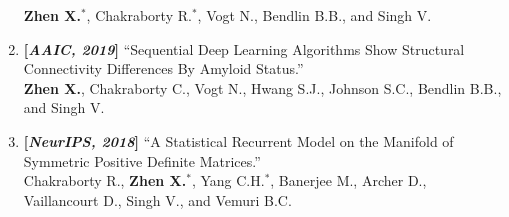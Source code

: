 \documentclass[margin]{res}
\begin{document}
\begin{resume}
\begin{enumerate}[noitemsep,wide=0pt,leftmargin=\dimexpr\labelwidth + 2\labelsep\relax]
                             \textbf{Zhen X.}$^*$, Chakraborty R.$^*$, Vogt N., Bendlin B.B., and Singh V. 
                \item \textbf{[\emph{AAIC, 2019}]} ``Sequential Deep Learning Algorithms Show Structural Connectivity Differences By Amyloid Status.''\\
                             \textbf{Zhen X.}, Chakraborty C., Vogt N., Hwang S.J., Johnson S.C., Bendlin B.B., and Singh V. 
                \item \textbf{[\emph{NeurIPS, 2018}]} ``A Statistical Recurrent Model on the Manifold of Symmetric Positive Definite Matrices.''\\
                             Chakraborty R., \textbf{Zhen X.}$^*$, Yang C.H.$^*$, Banerjee M., Archer D., Vaillancourt D., Singh V., and Vemuri B.C.
                \end{enumerate}


\vspace{-1em}

\end{resume}
\end{document}
